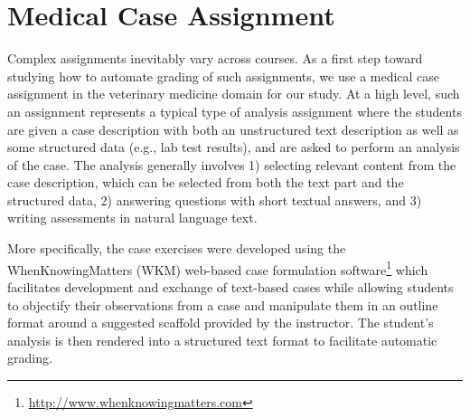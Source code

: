 \section{Medical Case Assignment}

Complex assignments inevitably vary across courses. As a first step toward
studying how to automate grading of such assignments, we  use a medical
case assignment in the veterinary medicine domain for our study. At a high
level, such an assignment represents a typical type of analysis assignment
where the students are given a case description with both an unstructured
text description as well as some structured data (e.g., lab test results),
and are asked to perform an analysis of the case. The analysis generally
involves 1) selecting relevant content from the case description, which can
be selected from both the text part and the structured data, 2) answering
questions with short textual answers, and 3) writing assessments in
natural language text.

More specifically, the case exercises were developed using
the WhenKnowingMatters (WKM) web-based case formulation
software\footnote{\url{http://www.whenknowingmatters.com}} which
facilitates development and exchange of text-based cases while allowing
students to objectify their observations from a case and manipulate them in
an outline format around a suggested scaffold provided by the instructor.
The student's analysis is then rendered into a structured text format to
facilitate automatic grading.

